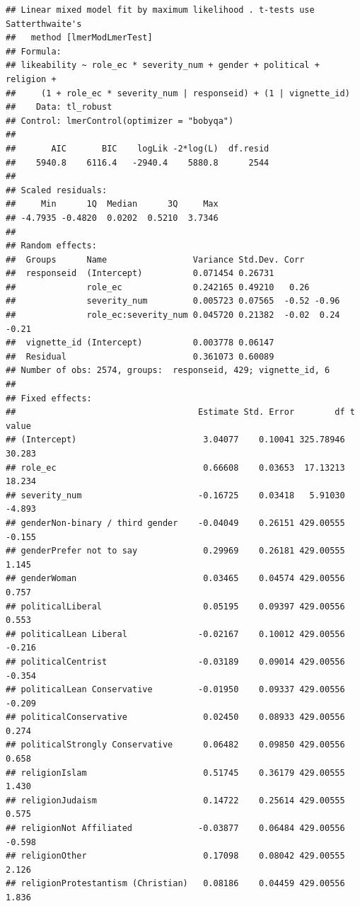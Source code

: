 \documentclass[
]{article}
\begin{document}
\begin{verbatim}
## Linear mixed model fit by maximum likelihood . t-tests use Satterthwaite's
##   method [lmerModLmerTest]
## Formula: 
## likeability ~ role_ec * severity_num + gender + political + religion +  
##     (1 + role_ec * severity_num | responseid) + (1 | vignette_id)
##    Data: tl_robust
## Control: lmerControl(optimizer = "bobyqa")
## 
##       AIC       BIC    logLik -2*log(L)  df.resid 
##    5940.8    6116.4   -2940.4    5880.8      2544 
## 
## Scaled residuals: 
##     Min      1Q  Median      3Q     Max 
## -4.7935 -0.4820  0.0202  0.5210  3.7346 
## 
## Random effects:
##  Groups      Name                 Variance Std.Dev. Corr             
##  responseid  (Intercept)          0.071454 0.26731                   
##              role_ec              0.242165 0.49210   0.26            
##              severity_num         0.005723 0.07565  -0.52 -0.96      
##              role_ec:severity_num 0.045720 0.21382  -0.02  0.24 -0.21
##  vignette_id (Intercept)          0.003778 0.06147                   
##  Residual                         0.361073 0.60089                   
## Number of obs: 2574, groups:  responseid, 429; vignette_id, 6
## 
## Fixed effects:
##                                    Estimate Std. Error        df t value
## (Intercept)                         3.04077    0.10041 325.78946  30.283
## role_ec                             0.66608    0.03653  17.13213  18.234
## severity_num                       -0.16725    0.03418   5.91030  -4.893
## genderNon-binary / third gender    -0.04049    0.26151 429.00555  -0.155
## genderPrefer not to say             0.29969    0.26181 429.00555   1.145
## genderWoman                         0.03465    0.04574 429.00556   0.757
## politicalLiberal                    0.05195    0.09397 429.00556   0.553
## politicalLean Liberal              -0.02167    0.10012 429.00556  -0.216
## politicalCentrist                  -0.03189    0.09014 429.00556  -0.354
## politicalLean Conservative         -0.01950    0.09337 429.00556  -0.209
## politicalConservative               0.02450    0.08933 429.00556   0.274
## politicalStrongly Conservative      0.06482    0.09850 429.00556   0.658
## religionIslam                       0.51745    0.36179 429.00555   1.430
## religionJudaism                     0.14722    0.25614 429.00555   0.575
## religionNot Affiliated             -0.03877    0.06484 429.00556  -0.598
## religionOther                       0.17098    0.08042 429.00555   2.126
## religionProtestantism (Christian)   0.08186    0.04459 429.00556   1.836

\end{verbatim}
\end{document}
